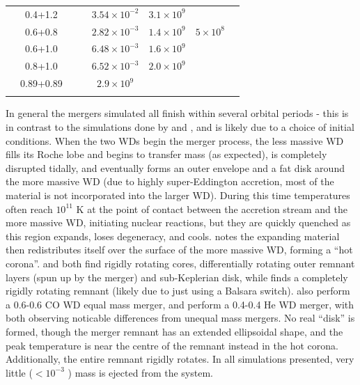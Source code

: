 \begin{table}
\begin{tabular}{cccccccc}
	& 0.4+1.2	& & & $3.54 \times 10^{-2}$ & $3.1 \times 10^9$ & & \\
	& 0.6+0.8	& & & $2.82 \times 10^{-3}$ & $1.4 \times 10^9$ & $5 \times 10^8$ & \\
	& 0.6+1.0	& & & $6.48 \times 10^{-3}$ & $1.6 \times 10^9$ & & \\
	& 0.8+1.0	& & & $6.52 \times 10^{-3}$ & $2.0 \times 10^9$ & & \\
\hline
\cite{pakm+10}	& 0.89+0.89	& & & $2.9 \times 10^9$ & & \\
\hline
\hline & \\[-1em]\hline
\end{tabular}
\label{simtable}
\end{table}


In general the mergers simulated all finish within several orbital periods - this is in contrast to the simulations done by \citeauthor{motl+07} and \citeauthor{dan+11}, and is likely due to a choice of initial conditions.  When the two WDs begin the merger process, the less massive WD fills its Roche lobe and begins to transfer mass (as expected), is completely disrupted tidally, and eventually forms an outer envelope and a fat disk around the more massive WD (due to highly super-Eddington accretion, most of the material is not incorporated into the larger WD).  During this time temperatures often reach $10^{11}$ K at the point of contact between the accretion stream and the more massive WD, initiating nuclear reactions, but they are quickly quenched as this region expands, loses degeneracy, and cools.  \citeauthor{loreig09} notes the expanding material then redistributes itself over the surface of the more massive WD, forming a ``hot corona''.  \citeauthor{loreig09} and \citeauthor{yoonpr07} both find rigidly rotating cores, differentially rotating outer remnant layers (spun up by the merger) and sub-Keplerian disk, while \citeauthor{guerig04} finds a completely rigidly rotating remnant (likely due to just using a Balsara switch).  \citeauthor{loreig09} also perform a 0.6-0.6 {\Msun} CO WD equal mass merger, and \citeauthor{guerig04} perform a 0.4-0.4 {\Msun} He WD merger, with both observing noticable differences from unequal mass mergers.  No real ``disk'' is formed, though the merger remnant has an extended ellipsoidal shape, and the peak temperature is near the centre of the remnant instead in the hot corona.  Additionally, the entire remnant rigidly rotates.  In all simulations presented, very little ($< 10^{-3}$ {\Msun}) mass is ejected from the system.

